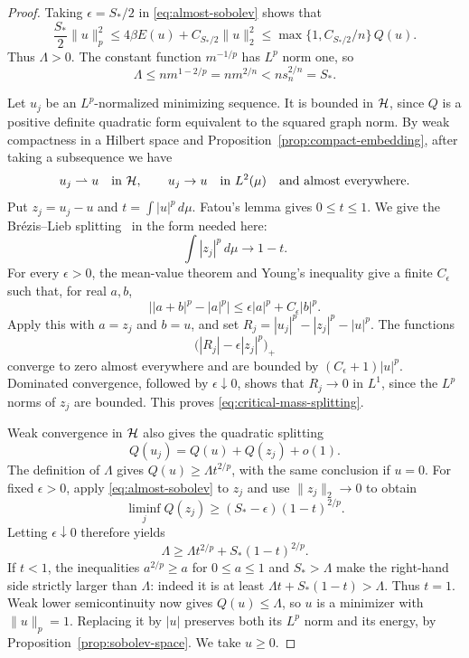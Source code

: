 \begin{proof}
Taking $\epsilon=S_*/2$ in \eqref{eq:almost-sobolev} shows that
\[
 \frac{S_*}{2}\|u\|_p^2
 \le4\beta E(u)+C_{S_*/2}\|u\|_2^2
 \le\max\{1,C_{S_*/2}/n\}\,Q(u).
\]
Thus $\Lambda>0$.  The constant function $m^{-1/p}$ has $L^p$ norm
one, so
\begin{equation}
 \Lambda\le n m^{1-2/p}=n m^{2/n}<ns_n^{2/n}=S_*.
 \label{eq:strict-subthreshold}
\end{equation}

Let $u_j$ be an $L^p$-normalized minimizing sequence.  It is bounded
in $\mathcal H$, since $Q$ is a positive definite quadratic form equivalent
to the squared graph norm.  By weak compactness in a Hilbert space
and Proposition~\ref{prop:compact-embedding}, after taking a
subsequence we have
\[
 u_j\rightharpoonup u\quad\hbox{in }\mathcal H,
 \qquad u_j\to u\quad\hbox{in }L^2(\mu)
 \quad\hbox{and almost everywhere}.
\]
Put $z_j=u_j-u$ and $t=\int|u|^p\,d\mu$.  Fatou's lemma gives
$0\le t\le1$. We give the Br\'ezis--Lieb
splitting~\cite[Theorem~1]{BrezisLieb1983} in the form needed here:
\begin{equation}
 \int|z_j|^p\,d\mu\longrightarrow1-t.
 \label{eq:critical-mass-splitting}
\end{equation}
For every $\epsilon>0$, the mean-value theorem and Young's
inequality give a finite $C_\epsilon$ such that, for real $a,b$,
\[
 \bigl||a+b|^p-|a|^p\bigr|
 \le\epsilon|a|^p+C_\epsilon|b|^p.
\]
Apply this with $a=z_j$ and $b=u$, and set
$R_j=|u_j|^p-|z_j|^p-|u|^p$.  The functions
\[
 \bigl(|R_j|-\epsilon|z_j|^p\bigr)_+
\]
converge to zero almost everywhere and are bounded by
$(C_\epsilon+1)|u|^p$.  Dominated convergence, followed by
$\epsilon\downarrow0$, shows that $R_j\to0$ in $L^1$, since the
$L^p$ norms of $z_j$ are bounded.  This proves
\eqref{eq:critical-mass-splitting}.

Weak convergence in $\mathcal H$ also gives the quadratic splitting
\[
 Q(u_j)=Q(u)+Q(z_j)+o(1).
\]
The definition of $\Lambda$ gives $Q(u)\ge\Lambda t^{2/p}$, with
the same conclusion if $u=0$.  For fixed $\epsilon>0$, apply
\eqref{eq:almost-sobolev} to $z_j$ and use $\|z_j\|_2\to0$ to obtain
\[
 \liminf_j Q(z_j)\ge(S_*-\epsilon)(1-t)^{2/p}.
\]
Letting $\epsilon\downarrow0$ therefore yields
\begin{equation}
 \Lambda\ge\Lambda t^{2/p}+S_*(1-t)^{2/p}.
 \label{eq:no-critical-mass-loss}
\end{equation}
If $t<1$, the inequalities $a^{2/p}\ge a$ for $0\le a\le1$ and
$S_*>\Lambda$ make the right-hand side strictly larger than
$\Lambda$: indeed it is at least
$\Lambda t+S_*(1-t)>\Lambda$.  Thus $t=1$.
Weak lower semicontinuity now gives $Q(u)\le\Lambda$, so $u$ is a
minimizer with $\|u\|_p=1$.  Replacing it by $|u|$ preserves both
its $L^p$ norm and its energy, by
Proposition~\ref{prop:sobolev-space}.  We take $u\ge0$.


\end{proof}
